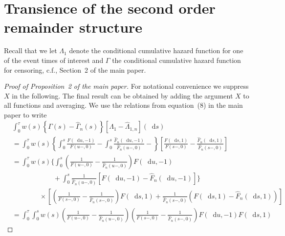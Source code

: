 \documentclass[11pt]{article}
\theoremstyle{thmstyleone}%
\theoremstyle{thmstyletwo}%
\theoremstyle{thmstylethree}%
\newcommand*\diff{\mathop{}\!\mathrm{d}}
\newcommand{\1}{\mathds{1}}
\begin{document}
\section{Transience of the second order remainder structure}
\label{sec:state-learner-with}

Recall that we let $\Lambda_1$ denote the conditional cumulative hazard function
for one of the event times of interest and $\Gamma$ the conditional cumulative
hazard function for censoring, c.f., Section~2 of the main paper.

\begin{proof}[Proof of Proposition~2 of the main paper]
  For notational convenience we suppress \( X \) in the following. The final
  result can be obtained by adding the argument \( X \) to all functions and
  averaging. We use the relations from equation~(8) in the main paper to write
  \begingroup %
  \allowdisplaybreaks
    \begin{align*}
      & \int_0^{\tau} w(s) 
        \left\{
        \Gamma(s) - \hat{\Gamma}_n(s)
        \right\}
        [\Lambda_1 - \hat{\Lambda}_{1,n}](\diff s)
      \\
      & =
        \int_0^{\tau} w(s) 
        \left\{
        \int_0^s \frac{F(\diff u, -1)}{F(u-, 0)} -
        \int_0^s \frac{\hat{F}_n(\diff u, -1)}{\hat{F}_n(u-, 0)}  -
        \right\}
        \left[
        \frac{F(\diff s, 1)}{F(s-, 0)}
        - \frac{\hat{F}_n(\diff s, 1)}{\hat{F}_n(s-, 0)}
        \right]
      \\
      & =
        \int_0^{\tau} w(s) 
        \Bigg\{
        \int_0^s 
        \left(
        \frac{1}{F(u-, 0)} -  \frac{1}{\hat{F}_n(u-, 0)}
        \right) F(\diff u, -1)
      \\
      & \qquad\qquad \qquad
        +
        \int_0^s \frac{1}{\hat{F}_n(u-, 0)} 
        \left[
        F(\diff u, -1) - \hat{F}_n(\diff u, -1)
        \right]
        \Bigg\}
      \\
      & \qquad\qquad \times
        \left[
        \left(
        \frac{1}{F(s-, 0)} -
        \frac{1}{\hat{F}_n(s-, 0)}
        \right)F(\diff s, 1)
        + \frac{1}{\hat{F}_n(s-, 0)}
        \left(
        F(\diff s, 1) -
        \hat{F}_n(\diff s, 1)
        \right)
        \right]
      \\
      &
        = \int_0^{\tau} 
        \int_0^s
        w(s) 
        \left(
        \frac{1}{F(u-, 0)} -  \frac{1}{\hat{F}_n(u-, 0)}
        \right) 
        \left(
        \frac{1}{F(s-, 0)} -
        \frac{1}{\hat{F}_n(s-, 0)}
        \right)F(\diff u, -1)F(\diff s, 1)

\end{align*}
\end{proof}
\end{document}
